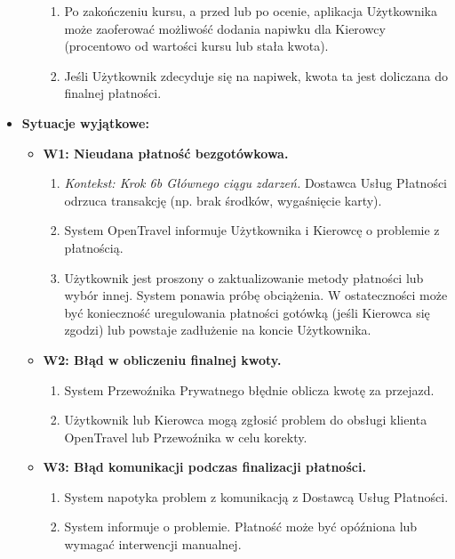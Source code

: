 \documentclass[a4paper,12pt]{article}
\begin{document}
\begin{itemize}
\begin{itemize}
                \begin{enumerate}
                    \item Po zakończeniu kursu, a przed lub po ocenie, aplikacja Użytkownika może zaoferować możliwość dodania napiwku dla Kierowcy (procentowo od wartości kursu lub stała kwota).
                    \item Jeśli Użytkownik zdecyduje się na napiwek, kwota ta jest doliczana do finalnej płatności.
                \end{enumerate}
        \end{itemize}
    \item \textbf{Sytuacje wyjątkowe:}
        \begin{itemize}
            \item \textbf{W1: Nieudana płatność bezgotówkowa.}
                \begin{enumerate}
                    \item \textit{Kontekst: Krok 6b Głównego ciągu zdarzeń.} Dostawca Usług Płatności odrzuca transakcję (np. brak środków, wygaśnięcie karty).
                    \item System OpenTravel informuje Użytkownika i Kierowcę o problemie z płatnością.
                    \item Użytkownik jest proszony o zaktualizowanie metody płatności lub wybór innej. System ponawia próbę obciążenia. W ostateczności może być konieczność uregulowania płatności gotówką (jeśli Kierowca się zgodzi) lub powstaje zadłużenie na koncie Użytkownika.
                \end{enumerate}
            \item \textbf{W2: Błąd w obliczeniu finalnej kwoty.}
                \begin{enumerate}
                    \item System Przewoźnika Prywatnego błędnie oblicza kwotę za przejazd.
                    \item Użytkownik lub Kierowca mogą zgłosić problem do obsługi klienta OpenTravel lub Przewoźnika w celu korekty.
                \end{enumerate}
            \item \textbf{W3: Błąd komunikacji podczas finalizacji płatności.}
                \begin{enumerate}
                    \item System napotyka problem z komunikacją z Dostawcą Usług Płatności.
                    \item System informuje o problemie. Płatność może być opóźniona lub wymagać interwencji manualnej.
                \end{enumerate}
        \end{itemize}
\end{itemize}
\end{document}

